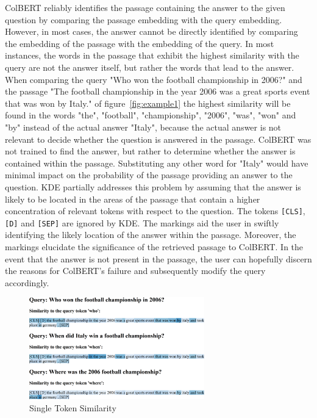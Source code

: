 \documentclass[11pt]{article}
\begin{document}
ColBERT reliably identifies the passage containing the answer to the given question by comparing the passage embedding with the query embedding. 
However, in most cases, the answer cannot be directly identified by comparing the embedding of the passage with the embedding of the query.
In most instances, the words in the passage that exhibit the highest similarity with the query are not the answer itself, but rather the words 
that lead to the answer.
When comparing the query "Who won the football championship in 2006?" and the passage "The football championship in the year 2006 was a great 
sports event that was won by Italy." of figure~\ref{fig:example1} the highest similarity will be found in the words "the", "football", "championship", "2006", "was", 
"won" and "by" instead  of the actual answer "Italy", because the actual answer is not relevant to decide whether the question is answered 
in the passage. 
ColBERT was not trained to find the answer, but rather to determine whether the answer is contained within the passage.
Substituting any other word for "Italy" would have minimal impact on the probability of the passage providing an answer to the question.
KDE partially addresses this problem by assuming that the answer is likely to be located in the areas of the passage 
that contain a higher concentration of relevant tokens with respect to the question.
The tokens \texttt{[CLS]}, \texttt{[D]} and \texttt{[SEP]} are ignored by KDE.
The markings aid the user in swiftly identifying the likely location of the answer within the passage. Moreover, the markings elucidate the 
significance of the retrieved passage to ColBERT. 
In the event that the answer is not present in the passage, the user can hopefully discern the reasons for ColBERT's failure and
subsequently modify the query accordingly.
 
\begin{figure}[h]
	\includegraphics[width = 7.6cm, left]{"./images/first_word_heatmap.png"}
	\caption{Single Token Similarity}
	\label{fig:example2}
\end{figure} 
\end{document}
